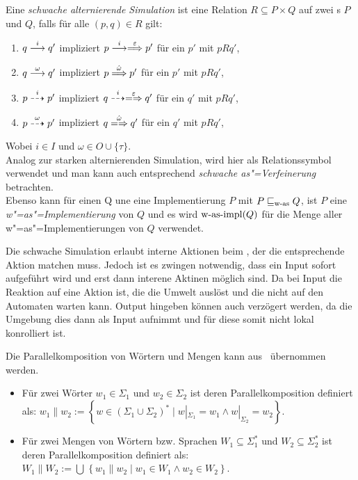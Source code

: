 \begin{Def}
  \label{wSimDef}
  Eine \emph{schwache alternierende Simulation} ist eine Relation $R\subseteq P
  \times Q$ auf zwei \MEIO{}s $P$ und $Q$, falls für alle $(p,q)\in R$ gilt:
  \begin{enumerate}
    \item $q\must[i] q'$ impliziert $p\must[i]\weakmust[\varepsilon] p'$ für
      ein $p'$ mit $pRq'$,
    \item $q\must[\omega] q'$ impliziert $p\weakmust[\hat{\omega}] p'$ für ein
      $p'$ mit $pRq'$,
    \item $p\may[i] p'$ impliziert $q\may[i]\weakmay[\varepsilon] q'$ für ein
      $q'$ mit $pRq'$,
    \item $p\may[\omega] p'$ impliziert $q\weakmay[\hat{\omega}] q'$ für ein
      $q'$ mit $pRq'$,
  \end{enumerate}
  Wobei $i\in I$ und $\omega\in O\cup\{\tau\}$.\\
  Analog zur starken alternierenden Simulation, wird hier \wasRel{} als
  Relationssymbol verwendet und man kann auch entsprechend \emph{schwache
  as"=Verfeinerung} betrachten.\\
  Ebenso kann für einen \MEIO{} Q une eine Implementierung $P$ mit $P\sqsubseteq _{\mathrm{w}\text{-}\mathrm{as}}
  Q$, ist $P$ eine \emph{w"=as"=Implementierung} von $Q$ und es wird $\mathrm{w}\text{-}\mathrm{as}\text{-}\mathrm{impl}
  (Q)$ für die Menge aller w"=as"=Implementierungen von $Q$ verwendet.
\end{Def}

Die schwache Simulation erlaubt interne Aktionen beim \MEIO{}, der die
entsprechende Aktion matchen muss. Jedoch ist es zwingen notwendig, dass ein
Input sofort aufgeführt wird und erst dann interene Aktinen möglich sind. Da
bei Input die Reaktion auf eine Aktion ist, die die Umwelt auslöst und die
nicht auf den Automaten warten kann. Output hingeben können auch verzögert
werden, da die Umgebung dies dann als Input aufnimmt und für diese somit nicht
lokal konrolliert ist.

Die Parallelkomposition von Wörtern und Mengen kann aus~\cite{Schinko2016BA}
übernommen werden.

\begin{Def}\mbox{}
  \begin{itemize}
    \item Für zwei Wörter $w_1\in\Sigma _1$ und $w_2\in\Sigma _2$ ist
      deren Parallelkomposition definiert als: $w_1\| w_2:=\left\{w\in
      (\Sigma _1\cup\Sigma _2)^*\mid w|_{\Sigma _1}=w_1\wedge w|_{\Sigma
    _2}=w_2\right\}$.
    \item Für zwei Mengen von Wörtern bzw. Sprachen $W_1\subseteq \Sigma
      ^*_1$ und $W_2\subseteq \Sigma ^*_2$ ist deren Parallelkomposition
      definiert als: $W_1\| W_2:=\bigcup\hspace{1pt}\left\{w_1\| w_2\mid
      w_1\in W_1\wedge w_2\in W_2\right\}$.
  \end{itemize}
\end{Def}

